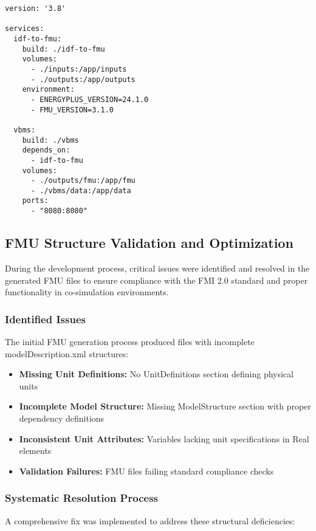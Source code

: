 \documentclass[12pt,a4paper]{article}
\begin{document}
\begin{lstlisting}[style=bash, caption=Docker Compose Configuration]
version: '3.8'

services:
  idf-to-fmu:
    build: ./idf-to-fmu
    volumes:
      - ./inputs:/app/inputs
      - ./outputs:/app/outputs
    environment:
      - ENERGYPLUS_VERSION=24.1.0
      - FMU_VERSION=3.1.0
    
  vbms:
    build: ./vbms
    depends_on:
      - idf-to-fmu
    volumes:
      - ./outputs/fmu:/app/fmu
      - ./vbms/data:/app/data
    ports:
      - "8080:8080"
\end{lstlisting}

\subsection{FMU Structure Validation and Optimization}

During the development process, critical issues were identified and resolved in the generated FMU files to ensure compliance with the FMI 2.0 standard and proper functionality in co-simulation environments.

\subsubsection{Identified Issues}

The initial FMU generation process produced files with incomplete modelDescription.xml structures:

\begin{itemize}
    \item \textbf{Missing Unit Definitions:} No UnitDefinitions section defining physical units
    \item \textbf{Incomplete Model Structure:} Missing ModelStructure section with proper dependency definitions
    \item \textbf{Inconsistent Unit Attributes:} Variables lacking unit specifications in Real elements
    \item \textbf{Validation Failures:} FMU files failing standard compliance checks
\end{itemize}

\subsubsection{Systematic Resolution Process}

A comprehensive fix was implemented to address these structural deficiencies:
\end{document}
